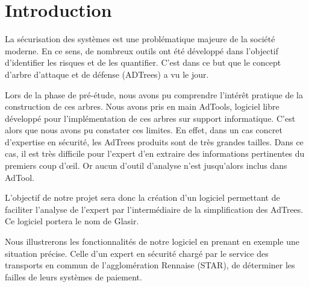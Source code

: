 \section{Introduction}
	
	La sécurisation des systèmes est une problématique majeure de la société moderne. En ce sens, de nombreux outils ont été développé dans l'objectif d'identifier les risques et de les quantifier. C'est dans ce but que le concept d'arbre d'attaque et de défense (ADTrees) a vu le jour. 
	
	Lors de la phase de pré-étude, nous avons pu comprendre l’intérêt pratique de la construction de ces arbres. Nous avons pris en main AdTools, logiciel libre développé pour l'implémentation de ces arbres sur support informatique. C'est alors que nous avons pu constater ces limites. En effet, dans un cas concret d'expertise en sécurité, les AdTrees produits sont de très grandes tailles. Dans ce cas, il est très difficile pour l'expert d'en extraire des informations pertinentes du premiers coup d’œil. Or aucun d'outil d'analyse n'est jusqu'alors inclus dans AdTool.

	L'objectif de notre projet sera donc la création d'un logiciel permettant de faciliter l'analyse de l'expert par l’intermédiaire de la simplification des AdTrees. Ce logiciel portera le nom de Glasir.

	Nous illustrerons les fonctionnalités de notre logiciel en prenant en exemple une situation précise. Celle d'un expert en sécurité chargé par le service des transports en commun de l'agglomération Rennaise (STAR), de déterminer les failles de leurs systèmes de paiement. 













